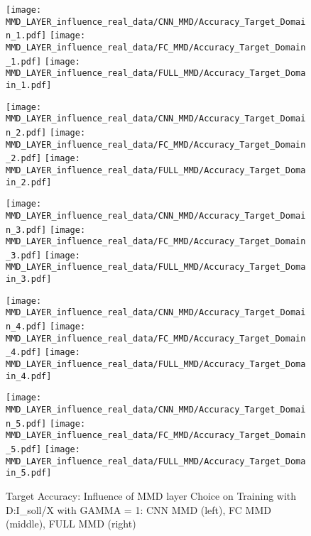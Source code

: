\begin{figure}[H]
  \centering

  \texttt{[image: MMD\_LAYER\_influence\_real\_data/CNN\_MMD/Accuracy\_Target\_Domain\_1.pdf]}
  \hspace{.1cm}
  \texttt{[image: MMD\_LAYER\_influence\_real\_data/FC\_MMD/Accuracy\_Target\_Domain\_1.pdf]}
  \hspace{.1cm}
  \texttt{[image: MMD\_LAYER\_influence\_real\_data/FULL\_MMD/Accuracy\_Target\_Domain\_1.pdf]}

  \vspace{.3cm}

  \texttt{[image: MMD\_LAYER\_influence\_real\_data/CNN\_MMD/Accuracy\_Target\_Domain\_2.pdf]}
  \hspace{.1cm}
  \texttt{[image: MMD\_LAYER\_influence\_real\_data/FC\_MMD/Accuracy\_Target\_Domain\_2.pdf]}
  \hspace{.1cm}
  \texttt{[image: MMD\_LAYER\_influence\_real\_data/FULL\_MMD/Accuracy\_Target\_Domain\_2.pdf]}

  \vspace{.3cm}

  \texttt{[image: MMD\_LAYER\_influence\_real\_data/CNN\_MMD/Accuracy\_Target\_Domain\_3.pdf]}
  \hspace{.1cm}
  \texttt{[image: MMD\_LAYER\_influence\_real\_data/FC\_MMD/Accuracy\_Target\_Domain\_3.pdf]}
  \hspace{.1cm}
  \texttt{[image: MMD\_LAYER\_influence\_real\_data/FULL\_MMD/Accuracy\_Target\_Domain\_3.pdf]}
  
    \vspace{.3cm}

  \texttt{[image: MMD\_LAYER\_influence\_real\_data/CNN\_MMD/Accuracy\_Target\_Domain\_4.pdf]}
  \hspace{.1cm}
  \texttt{[image: MMD\_LAYER\_influence\_real\_data/FC\_MMD/Accuracy\_Target\_Domain\_4.pdf]}
  \hspace{.1cm}
  \texttt{[image: MMD\_LAYER\_influence\_real\_data/FULL\_MMD/Accuracy\_Target\_Domain\_4.pdf]}
  
    \vspace{.3cm}
    
  \texttt{[image: MMD\_LAYER\_influence\_real\_data/CNN\_MMD/Accuracy\_Target\_Domain\_5.pdf]}
  \hspace{.1cm}
  \texttt{[image: MMD\_LAYER\_influence\_real\_data/FC\_MMD/Accuracy\_Target\_Domain\_5.pdf]}
  \hspace{.1cm}
  \texttt{[image: MMD\_LAYER\_influence\_real\_data/FULL\_MMD/Accuracy\_Target\_Domain\_5.pdf]}


  \caption{Target Accuracy: Influence of MMD layer Choice on Training with D:I\_soll/X with GAMMA = 1: CNN MMD (left), FC MMD (middle), FULL MMD (right)}
  \label{fig:target_accuracy_MMD_layer}
\end{figure}

